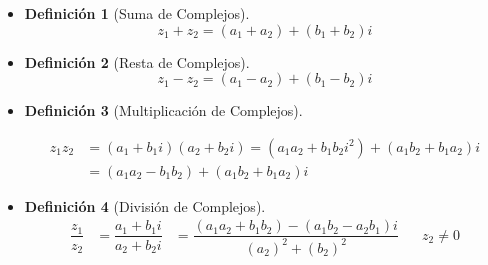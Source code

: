 \documentclass[12pt, fleqn]{report}                             %
\def \Eq {equation}                                             %
\newenvironment{MultiLineEquation}[1]                           %
        {\begin{\Eq}\begin{alignedat}{#1}}                          %
        {\end{alignedat}\end{\Eq}}                                  %
\newcommand \ForceNewLine       {$\Space$\\}                    %
\DeclareMathOperator \Space     {\quad}                         %
\newtheorem{Definition}     {Definición}[section]               %
\theoremstyle{break}                                            %
\begin{document}
            \begin{itemize}

                \item
                    \begin{Definition}[Suma de Complejos]
                    \label{SumaComplejos}
                        \begin{equation}
                            z_1 + z_2 = (a_1+a_2) + (b_1+b_2)i
                        \end{equation}
                    \end{Definition}

                \item
                    \begin{Definition}[Resta de Complejos]
                    \label{RestaComplejos}
                        \begin{equation}
                            z_1 - z_2 = (a_1-a_2) + (b_1-b_2)i
                        \end{equation}
                    \end{Definition}

                \item 
                    \begin{Definition}[Multiplicación de Complejos]
                    \label{MultiplicacionComplejos}

                        \begin{MultiLineEquation}{1}
                            z_1 z_2 &= (a_1+b_1i)(a_2+b_2i) 
                                     = (a_1a_2 + b_1b_2i^2) + (a_1b_2 + b_1a_2)i  \\
                                    &= (a_1a_2 - b_1b_2)   + (a_1b_2 + b_1a_2)i
                        \end{MultiLineEquation}

                    \end{Definition}

                \item 
                    \begin{Definition}[División de Complejos]
                    \label{DivisionComplejos}
                    \ForceNewLine
                        \begin{MultiLineEquation}{1}
                            \dfrac{z_1}{z_2}    &= \dfrac{a_1+b_1i}{a_2+b_2i} 
                                                &= \dfrac{(a_1a_2+b_1b_2)-(a_1b_2-a_2b_1)i}{(a_2)^2+(b_2)^2} \Space z_2 \neq 0
                        \end{MultiLineEquation}

                    \end{Definition}

            \end{itemize}
\end{document}

